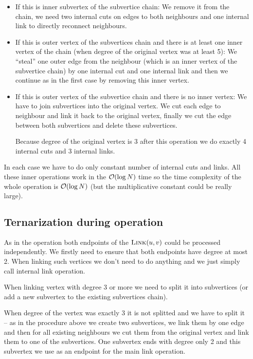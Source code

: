 \begin{itemize}
\item {\I If this is inner subvertex of the subvertice chain:} We remove it
from the chain, we need two internal cuts on edges to both neighbours and one
internal link to directly reconnect neighbours.
\item {\I If this is outer vertex of the subvertices chain and there is at least
one inner vertex of the chain (when degree of the original vertex was
at least 5):} We ``steal'' one outer edge from the neighbour (which is
an inner vertex of the subvertice chain) by one internal cut and one internal
link and then we continue as in the first case by removing this inner vertex.
\item {\I If this is outer vertex of the subvertice chain and there is no inner
vertex:} We have to join subvertices into the original vertex. We cut each edge
to neighbour and link it back to the original vertex, finally we cut the edge
between both subvertices and delete these subvertices.

Because degree of the original vertex is 3 after this operation we do exactly
4 internal cuts and 3 internal links.
\end{itemize}

In each case we have to do only constant number of internal cuts and links. All
these inner operations work in the ${\cal O}(\log N)$ time so the time complexity of
the whole \Cut{} operation is ${\cal O}(\log N)$ (but the multiplicative constant could
be really large).

\subsection{Ternarization during \Link{} operation}

As in the \Cut{} operation both endpoints of the $\hbox{\sc Link}(u,v)$ could be processed
independently. We firstly need to ensure that both endpoints have degree at
most 2. When linking such vertices we don't need to do anything and we just simply
call internal link operation.

When linking vertex with degree 3 or more we need to split it into subvertices
(or add a new subvertex to the existing subvertices chain).

When degree of the vertex was exactly 3 it is not splitted and we have to split
it -- as in the procedure above we create two subvertices, we link them by one
edge and then for all existing neighbours we cut them from the original vertex
and link them to one of the subvertices. One subvertex ends with degree only
2 and this subvertex we use as an endpoint for the main link operation.

